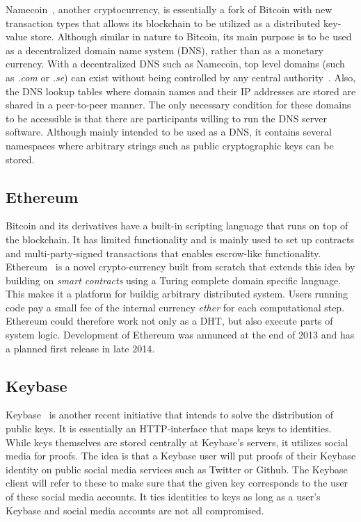 Namecoin~\cite{Namecoin:Online}, another cryptocurrency, is essentially a fork of Bitcoin with new transaction types that allows its blockchain to be utilized as a distributed key-value store. Although similar in nature to Bitcoin, its main purpose is to be used as a decentralized domain name system (DNS), rather than as a monetary currency. With a decentralized DNS such as Namecoin, top level domains (such as \emph{.com} or \emph{.se}) can exist without being controlled by any central authority~\cite{Coindesk:2013:Online}. Also, the DNS lookup tables where domain names and their IP addresses are stored are shared in a peer-to-peer manner. The only necessary condition for these domains to be accessible is that there are participants willing to run the DNS server software. Although mainly intended to be used as a DNS, it contains several namespaces where arbitrary strings such as public cryptographic keys can be stored.

\subsection{Ethereum}
Bitcoin and its derivatives have a built-in scripting language that runs on top of the blockchain. It has limited functionality and is mainly used to set up contracts and multi-party-signed transactions that enables escrow-like functionality. Ethereum~\cite{Ethereum:Online} is a novel crypto-currency built from scratch that extends this idea by building on \emph{smart contracts} using a Turing complete domain specific language. This makes it a platform for buildig arbitrary distributed system. Users running code pay a small fee of the internal currency \emph{ether} for each computational step. Ethereum could therefore work not only as a DHT, but also execute parts of system logic. Development of Ethereum was annunced at the end of 2013 and has a planned first release in late 2014.

\subsection{Keybase}
Keybase~\cite{Keybase:Online} is another recent initiative that intends to solve the distribution of public keys. It is essentially an HTTP-interface that maps keys to identities. While keys themselves are stored centrally at Keybase's servers, it utilizes social media for proofs. The idea is that a Keybase user will put proofs of their Keybase identity on public social media services such as Twitter or Github. The Keybase client will refer to these to make sure that the given key corresponds to the user of these social media accounts. It ties identities to keys as long as a user's Keybase and social media accounts are not all compromised.

